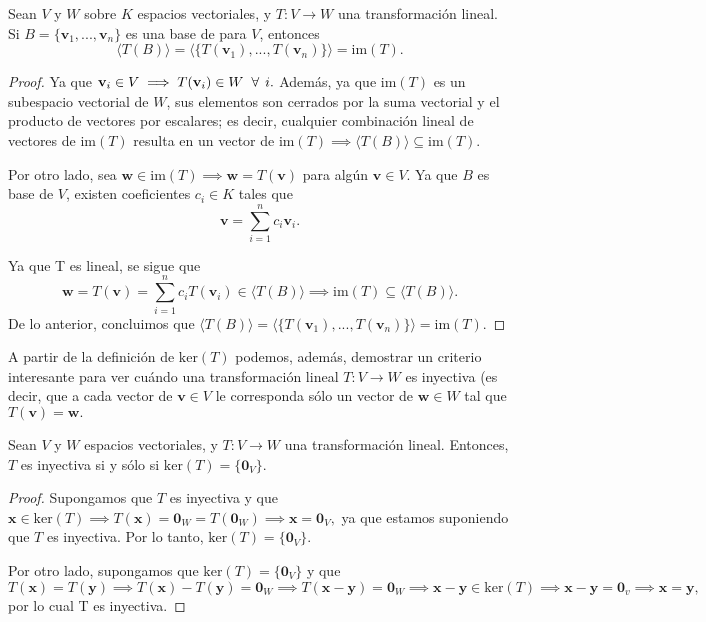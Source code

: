 \documentclass[12pt]{article}
\newenvironment{teorema}[2][Teorema]{\begin{trivlist}
\item[\hskip \labelsep {\bfseries #1}\hskip \labelsep {\bfseries #2.}]}{\end{trivlist}}
\begin{document}
\begin{teorema}{5.2.2}
    Sean $V$ y $W$ sobre $K$ espacios vectoriales, y $T:V\to W$ una transformación lineal. Si $B=\{\mathbf{v}_1,...,\mathbf{v}_n\}$ es una base de para $V$, entonces \[
        \langle T(B) \rangle = \langle \{T(\mathbf{v}_1),...,T(\mathbf{v}_n)\}\rangle = \text{im}(T)
    .\] 

\begin{proof}
    Ya que $\mathbf{v}_i\in V\implies T(\mathbf{v}_i)\in W\hspace{2mm} \forall \hspace{1.5mm} i.$ Además, ya que $\text{im}(T)$ es un subespacio vectorial de $W$, sus elementos son cerrados por la suma vectorial y el producto de vectores por escalares; es decir, cualquier combinación lineal de vectores de $\text{im}(T)$ resulta en un vector de $\text{im}(T)\implies \langle T(B)\rangle \subseteq \text{im}(T).$

    Por otro lado, sea $\mathbf{w}\in \text{im}(T)\implies \mathbf{w}=T(\mathbf{v})$ para algún $\mathbf{v}\in V.$ Ya que $B$ es base de $V$, existen coeficientes $c_i\in K$ tales que  \[
        \mathbf{v}=\sum_{i=1}^n c_i\mathbf{v}_i
    .\] 

    \noindent Ya que T es lineal, se sigue que \[
        \mathbf{w} =T(\mathbf{v})=\sum_{i=1}^n c_iT(\mathbf{v}_i)\in \langle T(B) \rangle \implies \text{im}(T) \subseteq \langle T(B)\rangle
    .\] \noindent De lo anterior, concluimos que $\langle T(B) \rangle = \langle \{T(\mathbf{v}_1),...,T(\mathbf{v}_n)\}\rangle = \text{im}(T).$

\end{proof}

\end{teorema}

A partir de la definición de $\text{ker}(T)$ podemos, además, demostrar un criterio interesante para ver cuándo una transformación lineal $T:V\to W$ es inyectiva (es decir, que a cada vector de $\mathbf{v}\in V$ le corresponda sólo un vector de $\mathbf{w}\in W$ tal que $T(\mathbf{v})=\mathbf{w}.$ 

\begin{teorema}{5.2.3}
    
    Sean $V$ y $W$ espacios vectoriales, y $T:V\to W$ una transformación lineal. Entonces, $T$ es inyectiva si y sólo si $\text{ker}(T)=\{\mathbf{0}_V\}.$

    \begin{proof}
        Supongamos que $T$ es inyectiva y que $\mathbf{x}\in \text{ker}(T)\implies T(\mathbf{x})=\mathbf{0}_W=T(\mathbf{0}_W)\implies \mathbf{x}=\mathbf{0}_V,$ ya que estamos suponiendo que $T$ es inyectiva. Por lo tanto, $\text{ker}(T)=\{\mathbf{0}_V\}.$

        Por otro lado, supongamos que $\text{ker}(T)=\{\mathbf{0}_V\}$ y que $T(\mathbf{x})=T(\mathbf{y})\implies T(\mathbf{x})-T(\mathbf{y})=\mathbf{0}_W\implies T(\mathbf{x}-\mathbf{y})=\mathbf{0}_W\implies \mathbf{x}-\mathbf{y}\in \text{ker}(T)\implies \mathbf{x}-\mathbf{y}=\mathbf{0}_v\implies \mathbf{x}=\mathbf{y},$ por lo cual T es inyectiva.

    \end{proof}
\end{teorema}
\end{document}
